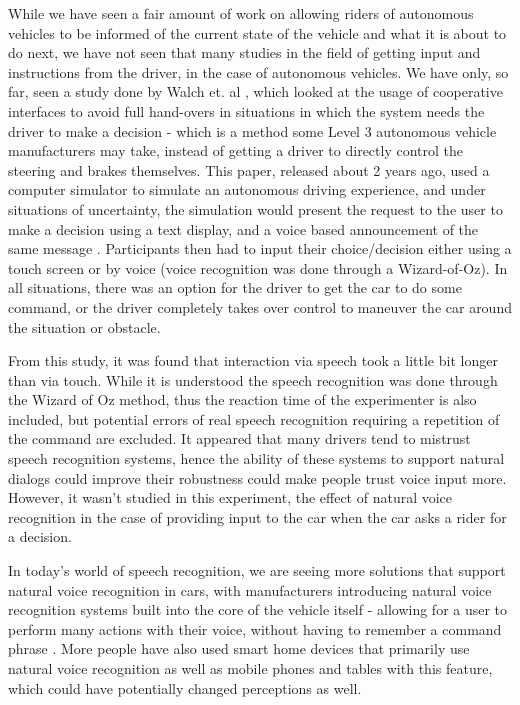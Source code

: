 \documentclass{sigchi}
\begin{document}
While we have seen a fair amount of work on allowing riders of autonomous vehicles to be informed of the current state of the vehicle and what it is about to do next, we have not seen that many studies in the field of getting input and instructions from the driver, in the case of autonomous vehicles. We have only, so far, seen a study done by Walch et. al \cite{Walch2016}, which looked at the usage of cooperative interfaces to avoid full hand-overs in situations in which the system needs the driver to make a decision - which is a method some Level 3 autonomous vehicle manufacturers may take, instead of getting a driver to directly control the steering and brakes themselves. This paper, released about 2 years ago, used a computer simulator to simulate an autonomous driving experience, and under situations of uncertainty, the simulation would present the request to the user to make a decision using a text display, and a voice based announcement of the same message \cite{Walch2016}. Participants then had to input their choice/decision either using a touch screen or by voice (voice recognition was done through a Wizard-of-Oz). In all situations, there was an option for the driver to get the car to do some command, or the driver completely takes over control to maneuver the car around the situation or obstacle.

From this study, it was found that interaction via speech took a little bit longer than via touch. While it is understood the speech recognition was done through the Wizard of Oz method, thus the reaction time of the experimenter is also included, but potential errors of real speech recognition requiring a repetition of the command are excluded. It appeared that many drivers tend to mistrust speech recognition systems, hence the ability of these systems to support natural dialogs could improve their robustness could make people trust voice input more. However, it wasn't studied in this experiment, the effect of natural voice recognition in the case of providing input to the car when the car asks a rider for a decision. 

In today's world of speech recognition, we are seeing more solutions that support natural voice recognition in cars, with manufacturers introducing natural voice recognition systems built into the core of the vehicle itself - allowing for a user to perform many actions with their voice, without having to remember a command phrase \cite{shapiro_2018} \cite{mbinnovations_2018}. More people have also used smart home devices that primarily use natural voice recognition as well as mobile phones and tables with this feature, which could have potentially changed perceptions as well.
\end{document}
